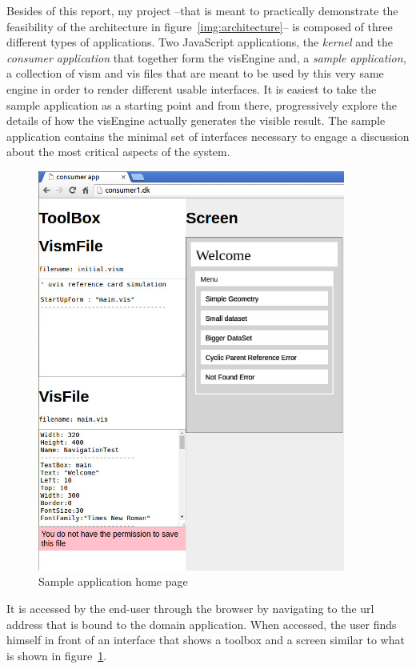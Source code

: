Besides of this report, my project --that is meant to practically demonstrate the feasibility of the architecture in figure~\ref{img:architecture}-- is composed of three different types of applications. Two JavaScript applications, the \emph{kernel} and the \emph{consumer application} that together form the visEngine and, a \emph{sample application}, a collection of vism and vis files that are meant to be used by this very same engine in order to render different usable interfaces. It is easiest to take the sample application as a starting point and from there, progressively explore the details of how the visEngine actually generates the visible result. The sample application contains the minimal set of interfaces necessary to engage a discussion about the most critical aspects of the system.

\begin{figure}
    \centering
    \includegraphics[width=0.9\textwidth]{images/home.jpg}
    \caption{Sample application home page}
    \label{img:home}
\end{figure}

It is accessed by the end-user through the browser by navigating to the url address that is bound to the domain application. 
 When accessed, the user finds himself in front of an interface that shows a toolbox and a screen similar to what is shown in figure~\ref{img:home}.

